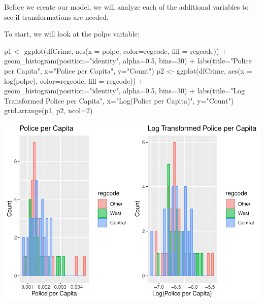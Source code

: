\documentclass[]{article}
\newenvironment{Shaded}{}{}
\newcommand{\DataTypeTok}[1]{#1}
\newcommand{\DecValTok}[1]{#1}
\newcommand{\FloatTok}[1]{#1}
\newcommand{\KeywordTok}[1]{\textcolor[rgb]{0.00,0.00,1.00}{#1}}
\newcommand{\NormalTok}[1]{#1}
\newcommand{\OperatorTok}[1]{#1}
\newcommand{\StringTok}[1]{\textcolor[rgb]{0.00,0.50,0.50}{#1}}
\begin{document}
Before we create our model, we will analyze each of the additional
variables to see if transformations are needed.

To start, we will look at the polpc variable:

\begin{Shaded}
\begin{Highlighting}[]
\NormalTok{p1 <-}\StringTok{ }\KeywordTok{ggplot}\NormalTok{(dfCrime, }\KeywordTok{aes}\NormalTok{(}\DataTypeTok{x =}\NormalTok{ polpc, }\DataTypeTok{color=}\NormalTok{regcode, }\DataTypeTok{fill =}\NormalTok{ regcode)) }\OperatorTok{+}
\StringTok{  }\KeywordTok{geom_histogram}\NormalTok{(}\DataTypeTok{position=}\StringTok{"identity"}\NormalTok{, }\DataTypeTok{alpha=}\FloatTok{0.5}\NormalTok{, }\DataTypeTok{bins=}\DecValTok{30}\NormalTok{) }\OperatorTok{+}
\StringTok{  }\KeywordTok{labs}\NormalTok{(}\DataTypeTok{title=}\StringTok{"Police per Capita"}\NormalTok{, }\DataTypeTok{x=}\StringTok{"Police per Capita"}\NormalTok{, }\DataTypeTok{y=}\StringTok{"Count"}\NormalTok{)}
\NormalTok{p2 <-}\StringTok{ }\KeywordTok{ggplot}\NormalTok{(dfCrime, }\KeywordTok{aes}\NormalTok{(}\DataTypeTok{x =} \KeywordTok{log}\NormalTok{(polpc), }\DataTypeTok{color=}\NormalTok{regcode, }\DataTypeTok{fill =}\NormalTok{ regcode)) }\OperatorTok{+}
\StringTok{  }\KeywordTok{geom_histogram}\NormalTok{(}\DataTypeTok{position=}\StringTok{"identity"}\NormalTok{, }\DataTypeTok{alpha=}\FloatTok{0.5}\NormalTok{, }\DataTypeTok{bins=}\DecValTok{30}\NormalTok{) }\OperatorTok{+}
\StringTok{  }\KeywordTok{labs}\NormalTok{(}\DataTypeTok{title=}\StringTok{"Log Transformed Police per Capita"}\NormalTok{, }\DataTypeTok{x=}\StringTok{"Log(Police per Capita)"}\NormalTok{, }\DataTypeTok{y=}\StringTok{"Count"}\NormalTok{)}
\KeywordTok{grid.arrange}\NormalTok{(p1, p2, }\DataTypeTok{ncol=}\DecValTok{2}\NormalTok{)}
\end{Highlighting}
\end{Shaded}

\includegraphics{Bagnard_Gaustad_Hartman_Leung_Lab_3_files/figure-latex/unnamed-chunk-64-1.pdf}
\end{document}
